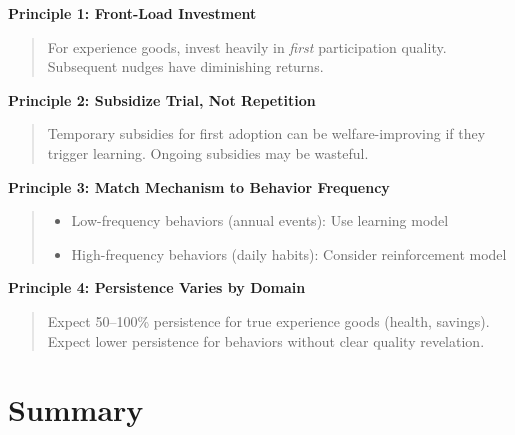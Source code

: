 \documentclass[11pt, a4paper]{article}
\begin{document}
\begin{tcolorbox}[colback=green!10!white, colframe=green!75!black,
    title=Policy Design Principles from Learning Literature]

\textbf{Principle 1: Front-Load Investment}
\begin{quote}
For experience goods, invest heavily in \textit{first} participation quality. Subsequent nudges have diminishing returns.
\end{quote}

\textbf{Principle 2: Subsidize Trial, Not Repetition}
\begin{quote}
Temporary subsidies for first adoption can be welfare-improving if they trigger learning. Ongoing subsidies may be wasteful.
\end{quote}

\textbf{Principle 3: Match Mechanism to Behavior Frequency}
\begin{quote}
\begin{itemize}[nosep]
    \item Low-frequency behaviors (annual events): Use learning model
    \item High-frequency behaviors (daily habits): Consider reinforcement model
\end{itemize}
\end{quote}

\textbf{Principle 4: Persistence Varies by Domain}
\begin{quote}
Expect 50--100\% persistence for true experience goods (health, savings). Expect lower persistence for behaviors without clear quality revelation.
\end{quote}

\end{tcolorbox}


\section{Summary}
\label{sec:lrn-summary}
\end{document}
